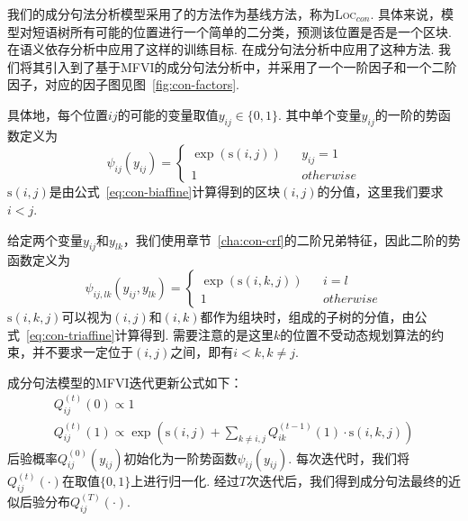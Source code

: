 我们的成分句法分析模型采用了\citet{gaddy-etal-2018-whats}的方法作为基线方法，称为\textsc{Loc}$_{con}$.
具体来说，模型对短语树所有可能的位置进行一个简单的二分类，预测该位置是否是一个区块.
\citet{dozat-manning-2018-simpler,wang-etal-2019-second}在语义依存分析中应用了这样的训练目标.
\citet{gormley-eisner-2015-structured,naradowsky-etal-2012-grammarless}在成分句法分析中应用了这种方法.
我们将其引入到了基于MFVI的成分句法分析中，并采用了一个一阶因子和一个二阶因子，对应的因子图见图~\ref{fig:con-factors}.

具体地，每个位置$ij$的可能的变量取值$y_{ij}\in \{0,1\}$.
其中单个变量$y_{ij}$的一阶的势函数定义为
\begin{equation}
  \label{eq:con-1o-potential}
  \psi_{ij}(y_{ij})=\left\{
  \begin{array}{rcl}
    \exp\left(\mathrm{s}(i,j)\right) &  & {y_{ij}=1}  \\
    1                                &  & {otherwise}
  \end{array}
  \right.
\end{equation}
$\mathrm{s}(i,j)$是由公式~\ref{eq:con-biaffine}计算得到的区块$(i,j)$的分值，这里我们要求$i<j$.

给定两个变量$y_{ij}$和$y_{lk}$，我们使用章节~\ref{cha:con-crf}的二阶兄弟特征，因此二阶的势函数定义为
\begin{equation}
  \label{eq:2o-con-potential}
  \psi_{ij,lk}(y_{ij},y_{lk})=\left\{
  \begin{array}{rcl}
    \exp\left(\mathrm{s}(i,k,j)\right) &  & {i=l}       \\
    1                                  &  & {otherwise}
  \end{array}
  \right.
\end{equation}
$\mathrm{s}(i,k,j)$可以视为$(i,j)$和$(i,k)$都作为组块时，组成的子树的分值，由公式~\ref{eq:con-triaffine}计算得到.
需要注意的是这里$k$的位置不受动态规划算法的约束，并不要求一定位于$(i,j)$之间，即有$i<k,k\neq j$.

成分句法模型的MFVI迭代更新公式如下：
\begin{equation}
  \label{eq:mfvi-con}
  \begin{array}{l}
    Q_{ij}^{(t)}(0)\propto 1 \\
    Q_{ij}^{(t)}(1)\propto \exp\left(\mathrm{s}(i,j) +\sum_{k\neq i,j} Q_{ik}^{(t-1)}(1)\cdot \mathrm{s}(i,k,j) \right)
  \end{array}
\end{equation}
后验概率$Q_{ij}^{(0)}(y_{ij})$初始化为一阶势函数$\psi_{ij}(y_{ij})$.
每次迭代时，我们将$Q_{ij}^{(t)}(\cdot)$在取值$\{0,1\}$上进行归一化.
经过$T$次迭代后，我们得到成分句法最终的近似后验分布$Q_{ij}^{(T)}(\cdot)$.

